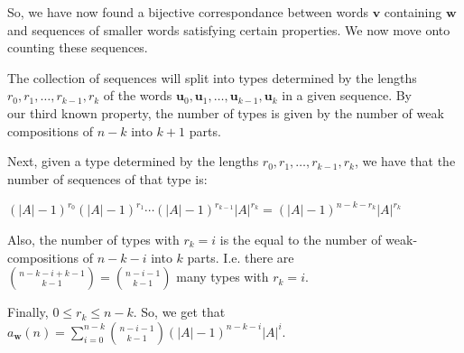 \documentclass{book}
\newenvironment{myIndent}{%
   \begin{adjustwidth}{2.5em}{0em}%
}{%
   \end{adjustwidth}%
}
\newcommand{\retTwo}{\hfill\bigbreak}
\begin{document}
\begin{myIndent}
   So, we have now found a bijective correspondance between words $\bm{v}$ containing $\bm{w}$ and sequences of smaller words satisfying certain properties. We now move onto counting these sequences.\retTwo

   The collection of sequences will split into types determined by the lengths\\ $r_0, r_1, \ldots, r_{k-1}, r_k$ of the words $\bm{u}_0, \bm{u}_1, \ldots, \bm{u}_{k-1}, \bm{u}_k$ in a given sequence. By\\ our third known property, the number of types is given by the number of weak\\ compositions of $n - k$ into $k + 1$ parts.\retTwo

   Next, given a type determined by the lengths $r_0, r_1, \ldots, r_{k-1}, r_k$, we have that the number of sequences of that type is:
   
   {\centering $(|A| - 1)^{r_0}(|A| - 1)^{r_1}\cdots(|A| - 1)^{r_{k-1}}|A|^{r_k} = (|A| - 1)^{n-k-r_k}|A|^{r_k}$\retTwo\par}

   Also, the number of types with $r_k = i$ is the equal to the number of weak-compositions of $n - k - i$ into $k$ parts. I.e. there are $\binom{n - k - i + k - 1}{k - 1} = \binom{n - i -1}{k - 1}$ many types with $r_k = i$.\retTwo

   Finally, $0 \leq r_k \leq n - k$. So, we get that $a_{\bm{w}}(n) = \sum\limits_{i = 0}^{n - k}\binom{n - i -1}{k - 1}(|A| - 1)^{n - k - i}|A|^i$.\newpage

   


   
\end{myIndent}
\end{document}
